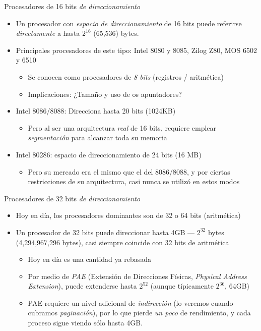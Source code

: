\documentclass[presentation]{beamer}
\begin{document}
\begin{frame}[label={sec:orga98cfd7}]{Procesadores de 16 bits \emph{de direccionamiento}}
\begin{itemize}
\item Un procesador con \emph{espacio de direccionamiento} de 16 bits puede
referirse \emph{directamente} a hasta \(2^{16}\) (65,536) bytes.
\item Principales procesadores de este tipo: Intel 8080 y 8085, Zilog
Z80, MOS 6502 y 6510
\begin{itemize}
\item Se conocen como procesadores de \emph{8 bits} (registros / aritmética)
\item Implicaciones: ¿Tamaño y uso de os apuntadores?
\end{itemize}
\item Intel 8086/8088: Direcciona hasta 20 bits (1024KB)
\begin{itemize}
\item Pero al ser una arquitectura \emph{real} de 16 bits, requiere emplear
\emph{segmentación} para alcanzar toda su memoria
\end{itemize}
\item Intel 80286: espacio de direccionamiento de 24 bits (16 MB)
\begin{itemize}
\item Pero su mercado era el mismo que el del 8086/8088, y por ciertas
restricciones de su arquitectura, casi nunca se utilizó en estos
modos
\end{itemize}
\end{itemize}
\end{frame}

\begin{frame}[label={sec:orge63e746}]{Procesadores de 32 bits \emph{de direccionamiento}}
\begin{itemize}
\item Hoy en día, los procesadores dominantes son de 32 o 64 bits
(aritmética)
\item Un procesador de 32 bits puede direccionar hasta 4GB — \(2^{32}\)
bytes (4,294,967,296 bytes), casi siempre coincide con 32 bits de
aritmética
\begin{itemize}
\item Hoy en día es una cantidad ya rebasada
\item Por medio de \emph{PAE} (Extensión de Direcciones Físicas, \emph{Physical
Address Extension}), puede extenderse hasta \(2^{52}\) (aunque
típicamente \(2^{36}\), 64GB)
\item PAE requiere un nivel adicional de \emph{indirección} (lo veremos
cuando cubramos \emph{paginación}), por lo que pierde \emph{un poco} de
rendimiento, y cada proceso sigue viendo sólo hasta 4GB.
\end{itemize}
\end{itemize}
\end{frame}
\end{document}
